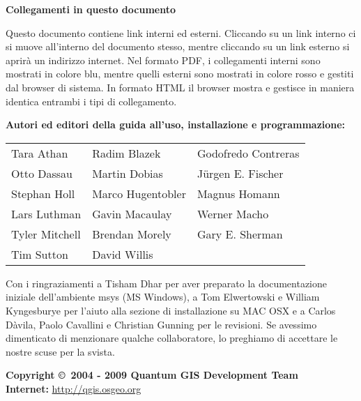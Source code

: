 \textbf{Collegamenti in questo documento}

Questo documento contiene link interni ed esterni. Cliccando su un
link interno ci si muove all'interno del documento stesso, mentre
cliccando su un link esterno si aprirà un indirizzo internet. Nel
formato PDF, i collegamenti interni sono mostrati in colore blu,
mentre quelli esterni sono mostrati in colore rosso e gestiti dal
browser di sistema. In formato HTML il browser mostra e gestisce in
maniera identica entrambi i tipi di collegamento.

\begin{flushleft}
\textbf{Autori ed editori della guida all'uso, installazione e programmazione:}
 
\begin{tabular}{p{5cm} p{5cm} p{5cm}}
Tara Athan & Radim Blazek & Godofredo Contreras \\
Otto Dassau & Martin Dobias & J\"urgen E. Fischer \\ 
Stephan Holl & Marco Hugentobler & Magnus Homann \\ 
Lars Luthman & Gavin Macaulay & Werner Macho \\
Tyler Mitchell & Brendan Morely & Gary E. Sherman \\ 
Tim Sutton & David Willis &  \\
\end{tabular}
\end{flushleft}

Con i ringraziamenti a Tisham Dhar per aver preparato la documentazione
iniziale dell'ambiente msys (MS Windows), a Tom Elwertowski e William
Kyngesburye per l'aiuto alla sezione di installazione su MAC OSX e
a Carlos Dàvila, Paolo Cavallini e Christian Gunning per le revisioni.
Se avessimo dimenticato di menzionare qualche collaboratore, lo preghiamo
di accettare le nostre scuse per la svista.

\textbf{Copyright \copyright~2004 - 2009 Quantum GIS Development Team} \\
\textbf{Internet:} \url{http://qgis.osgeo.org}


